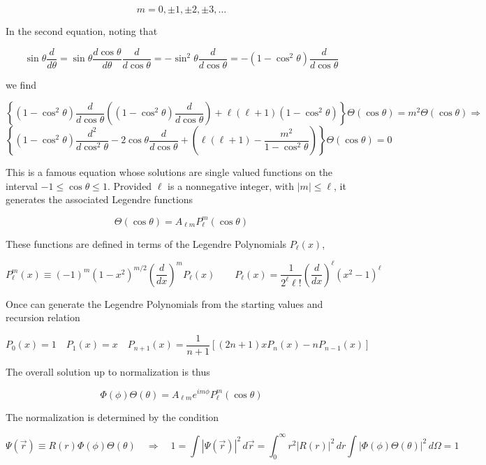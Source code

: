 \[
m = 0, \pm 1, \pm 2,\pm 3, \hdots
\] \vspace{3px}

In the second equation, noting that 

\[
\sin\theta \frac{d }{d \theta}  = \sin\theta \frac{d \cos\theta}{d \theta}
\frac{d }{d \cos\theta} = -\sin^2 \theta \frac{d }{d \cos\theta}
= -(1-\cos^2\theta) \frac{d }{d \cos\theta}  
\] \vspace{3px}

we find 

\[
\left\{ (1 - \cos^2 \theta) \frac{d}{d \cos \theta} \left( (1 - \cos^2 \theta)
\frac{d}{d \cos \theta} \right) + \ell(\ell + 1)(1 - \cos^2 \theta) \right\}
\Theta(\cos \theta) = m^2 \Theta(\cos \theta) \Rightarrow
\]
\[
\left\{ (1 - \cos^2 \theta) \frac{d^2}{d \cos^2 \theta} - 2 \cos \theta \frac{d}{d \cos \theta} + \left( \ell(\ell + 1) - \frac{m^2}{1 - \cos^2 \theta} \right) \right\} \Theta(\cos \theta) = 0
\]




This is a famous equation whose solutions are single valued functions on the
interval $-1 \leq \cos \theta \leq 1$. Provided  $\ell$ is a nonnegative
integer, with $|m| \leq \ell$, it generates the associated Legendre functions 

\[
  \Theta(\cos \theta) = A_{\ell m} P_\ell^m (\cos\theta) 
\] \vspace{3px}

These functions are defined in terms of the Legendre Polynomials $P_\ell(x)$, 

\[
P_\ell^m (x) \equiv (-1)^{m} (1-x^2)^{m/2} \left( \frac{d }{d x}  \right)^{m}
P_\ell (x) \qquad P_\ell(x) = \frac{1}{2^{\ell} \ell!} \left( \frac{d }{d x}
\right)^{\ell} (x^2 - 1)^{\ell}  
\] \vspace{3px}

Once can generate the Legendre Polynomials from the starting values and
recursion relation 

\[
  P_0(x) = 1 \quad P_1(x) = x \quad P_{n+1} (x) = \frac{1}{n+1} [(2n + 1)x
  P_n(x) - nP_{n-1} (x) ]
\] \vspace{3px}

The overall solution up to normalization is thus 

\[
  \Phi(\phi)\Theta(\theta) = A_{\ell m} e^{im\phi} P_\ell^{m} (\cos\theta)
\] \vspace{3px}

The normalization is determined by the condition 

\[
\Psi(\vec{r}) \equiv R(r)\Phi(\phi)\Theta(\theta) \quad \Rightarrow \quad
1 = \int |\Psi(\vec{r})|^2 \, d\vec{r} = \int_{0}^{\infty} r^2 |R(r)|^2 \, dr
  \int |\Phi(\phi)\Theta(\theta)|^2 \, d\Omega = 1
\] \vspace{3px}

